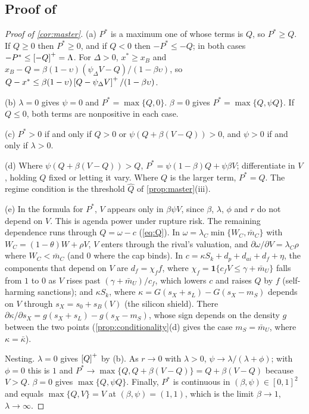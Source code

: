 \subsection{Proof of \texorpdfstring{}{threshold and channels}}

\begin{proof}[Proof of \cref{cor:master}]
(a) $P^*$ is a maximum one of whose terms is $Q$, so $P^*\ge Q$. If $Q\ge 0$ then $P^*\ge 0$, and if $Q<0$ then $-P^*\le -Q$; in both cases $-P^*\le\left[-Q\right]^{+}=\Lambda$. For $\Delta>0$, $x^*\ge x_B$ and $x_B-Q=\beta(1-\upsilon)(\psi_\Delta V-Q)/(1-\beta\upsilon)$, so $Q-x^*\le\beta(1-\upsilon)\left[Q-\psi_\Delta V\right]^{+}/(1-\beta\upsilon)$.

(b) $\lambda=0$ gives $\psi=0$ and $P^*=\max\{Q,0\}$. $\beta=0$ gives $P^*=\max\{Q,\psi Q\}$. If $Q\le 0$, both terms are nonpositive in each case.

(c) $P^*>0$ if and only if $Q>0$ or $\psi(Q+\beta(V-Q))>0$, and $\psi>0$ if and only if $\lambda>0$.

(d) Where $\psi(Q+\beta(V-Q))>Q$, $P^*=\psi(1-\beta)Q+\psi\beta V$; differentiate in $V$, holding $Q$ fixed or letting it vary. Where $Q$ is the larger term, $P^*=Q$. The regime condition is the threshold $\hat Q$ of \cref{prop:master}(iii).

(e) In the formula for $P^*$, $V$ appears only in $\beta\psi V$, since $\beta$, $\lambda$, $\phi$ and $r$ do not depend on $V$. This is agenda power under rupture risk. The remaining dependence runs through $Q=\omega-c$ (\cref{eq:Q}). In $\omega=\lambda_C\min\{W_C,\bar m_C\}$ with $W_C=(1-\theta)W+\rho V$, $V$ enters through the rival's valuation, and $\partial\omega/\partial V=\lambda_C\rho$ where $W_C<\bar m_C$ (and $0$ where the cap binds). In $c=\kappa S_k+d_p+d_{ai}+d_f+\eta$, the components that depend on $V$ are $d_f=\chi_f f$, where $\chi_f=\mathbf 1\{c_f V\le\gamma+\bar m_U\}$ falls from $1$ to $0$ as $V$ rises past $(\gamma+\bar m_U)/c_f$, which lowers $c$ and raises $Q$ by $f$ (self-harming sanctions); and $\kappa S_k$, where $\kappa=G(s_X+s_L)-G(s_X-m_S)$ depends on $V$ through $s_X=s_0+s_B(V)$ (the silicon shield). There $\partial\kappa/\partial s_X=g(s_X+s_L)-g(s_X-m_S)$, whose sign depends on the density $g$ between the two points (\cref{prop:conditionality}(d) gives the case $m_S=\bar m_U$, where $\kappa=\bar\kappa$).

Nesting. $\lambda=0$ gives $\left[Q\right]^{+}$ by (b). As $r\to 0$ with $\lambda>0$, $\psi\to\lambda/(\lambda+\phi)$; with $\phi=0$ this is $1$ and $P^*\to\max\{Q,Q+\beta(V-Q)\}=Q+\beta(V-Q)$ because $V>Q$. $\beta=0$ gives $\max\{Q,\psi Q\}$. Finally, $P^*$ is continuous in $(\beta,\psi)\in[0,1]^2$ and equals $\max\{Q,V\}=V$ at $(\beta,\psi)=(1,1)$, which is the limit $\beta\to 1$, $\lambda\to\infty$.
\end{proof}

